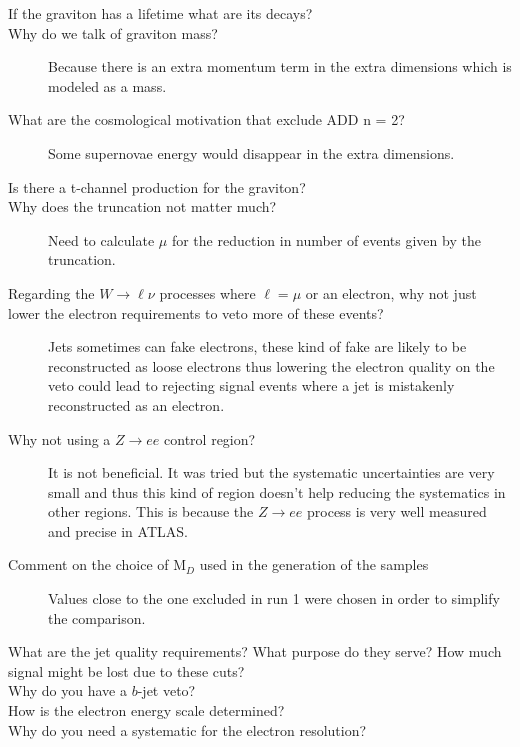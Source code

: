 \documentclass[a4paper,10pt,twoside,notitlepage]{article}
\begin{document}
\begin{description}
\item[If the graviton has a lifetime what are its decays?]

\item[Why do we talk of graviton mass?] Because there is an extra momentum term
  in the extra dimensions which is modeled as a mass.

\item[What are the cosmological motivation that exclude ADD n = 2?] Some
  supernovae energy would disappear in the extra dimensions.

\item[Is there a t-channel production for the graviton?]

\item[Why does the truncation not matter much?] Need to calculate $\mu$ for the
  reduction in number of events given by the truncation.

\item[Regarding the $W \rightarrow \ell \nu$ processes where $\ell = \mu$ or an
  electron, why not just lower the electron requirements to veto more of these
  events?] Jets sometimes can fake electrons, these kind of fake are likely to
  be reconstructed as loose electrons thus lowering the electron quality on the
  veto could lead to rejecting signal events where a jet is mistakenly
  reconstructed as an electron.

\item[Why not using a $Z \rightarrow ee$ control region?] It is not
  beneficial. It was tried but the systematic uncertainties are very small and
  thus this kind of region doesn't help reducing the systematics in other
  regions. This is because the $Z \rightarrow ee$ process is very well measured
  and precise in ATLAS.

\item[Comment on the choice of M$_D$ used in the generation of the samples]
  Values close to the one excluded in run 1 were chosen in order to simplify the
  comparison.

\item[What are the jet quality requirements? What purpose do they serve? How
  much signal might be lost due to these cuts?]

\item[Why do you have a $b$-jet veto?]

\item[How is the electron energy scale determined?]

\item[Why do you need a systematic for the electron resolution?]


\end{description}
\end{document}
